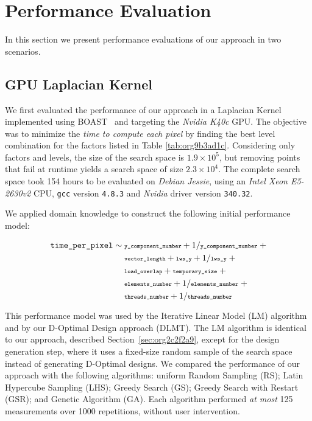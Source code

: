 \documentclass[conference]{IEEEtran}
\begin{document}
\section{Performance Evaluation}
\label{sec:org5a24378}
In this section we present performance evaluations of our approach in two
scenarios.
\vspace{-5pt}
\subsection{GPU Laplacian Kernel}
\label{sec:orge0a61bd}
We first evaluated the performance of our approach in a Laplacian Kernel
implemented using BOAST~\cite{videau2017boast} and targeting the \emph{Nvidia
K40c} GPU. The objective was to minimize the \emph{time to compute each pixel} by
finding the best level combination for the factors listed in Table
\ref{tab:org9b3ad1c}. Considering only factors and levels, the size of the
search space is \(1.9\times10^5\), but removing points that fail at runtime yields
a search space of size \(2.3\times10^4\). The complete search space took 154 hours
to be evaluated on \emph{Debian Jessie}, using an \emph{Intel Xeon E5-2630v2} CPU,
\texttt{gcc} version \texttt{4.8.3} and \emph{Nvidia} driver version \texttt{340.32}.

We applied domain knowledge to construct the following initial performance model:
\vspace{-2pt}
\\\begin{minipage}{\linewidth}\scriptsize
\begin{align}
\label{eq:gpu_laplacian_performance_model}
\texttt{time\_per\_pixel} \sim & \scriptsize\; \texttt{y\_component\_number} + 1 / \texttt{y\_component\_number} \; + \nonumber \\
& \scriptsize\; \texttt{vector\_length} + \texttt{lws\_y} + 1 / \texttt{lws\_y} \; + \nonumber \\
& \scriptsize\; \texttt{load\_overlap} + \texttt{temporary\_size} \; + \\
& \scriptsize\; \texttt{elements\_number} + 1 / \texttt{elements\_number} \; + \nonumber \\
& \scriptsize\; \texttt{threads\_number} + 1 /\texttt{threads\_number} \nonumber
\end{align}
\vspace{2pt}
\end{minipage}
This performance model was used by the Iterative Linear Model (LM) algorithm and
by our D-Optimal Design approach (DLMT). The LM algorithm is identical to our
approach, described Section~\ref{sec:org2c2f2a9}, except
for the design generation step, where it uses a fixed-size random sample of the
search space instead of generating D-Optimal designs. We compared the
performance of our approach with the following algorithms: uniform Random
Sampling (RS); Latin Hypercube Sampling (LHS); Greedy Search (GS); Greedy Search
with Restart (GSR); and Genetic Algorithm (GA). Each algorithm performed \emph{at
most} 125 measurements over 1000 repetitions, without user intervention.
\end{document}
